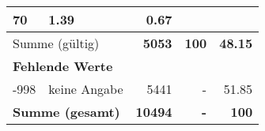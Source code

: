 \begin{longtable}{lXrrr}
       \num{70} &
       \num[round-mode=places,round-precision=2]{1,39} &
         \num[round-mode=places,round-precision=2]{0,67} \\
     \midrule
     \multicolumn{2}{l}{Summe (gültig)} &
       \textbf{\num{5053}} &
     \textbf{100} &
       \textbf{\num[round-mode=places,round-precision=2]{48,15}} \\
     \multicolumn{5}{l}{\textbf{Fehlende Werte}}\\
       -998 &
       keine Angabe &
         \num{5441} &
        - &
         \num[round-mode=places,round-precision=2]{51,85} \\
     \midrule
     \multicolumn{2}{l}{\textbf{Summe (gesamt)}} &
          \textbf{\num{10494}} &
        \textbf{-} &
        \textbf{100} \\
     \bottomrule
     \end{longtable}
     
